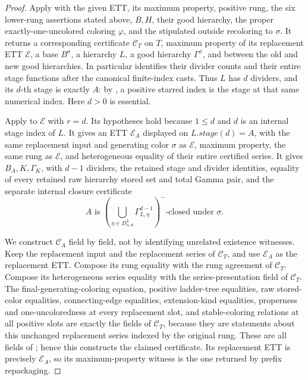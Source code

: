 \begin{proof}
Apply  with the given ETT, its maximum
property, positive rung, the six lower-rung assertions stated above,
$B,H$, their good hierarchy, the proper exactly-one-uncolored coloring
$\varphi$, and the stipulated outside recoloring to $\sigma$.
It returns a corresponding certificate $\mathcal C_T$ on $T$, maximum
property of its replacement ETT $\mathcal E$, a base $B^\sigma$, a
hierarchy $L$, a good hierarchy $\Gamma^\sigma$, and
 between the old and new good hierarchies.
In particular  identifies their divider
counts and their entire stage functions after the canonical finite-index
casts. Thus $L$ has $d$ dividers, and its $d$-th stage is exactly $A$:
by , a positive starred index is the
stage at that same numerical index. Here $d>0$ is essential.

Apply  to $\mathcal E$ with
$r=d$. Its hypotheses hold because $1\leq d$ and $d$ is an internal
stage index of $L$. It gives an ETT $\mathcal E_A$ displayed on
$L.\mathit{stage}(d)=A$, with the same replacement input and generating
color $\sigma$ as $\mathcal E$, maximum property, the same rung as
$\mathcal E$, and heterogeneous equality of their entire certified
series. It gives $B_A,K,\Gamma_K$, with $d-1$ dividers, the retained
stage and divider identities, equality of every retained raw hierarchy
stored set and total Gamma pair, and the separate internal closure
certificate
\[
 A\text{ is }
 \left(\bigcup_{\eta\in D^L_{n,d}}\Gamma^{d-1}_{L,\eta}\right)^-
 \text{-closed under }\sigma.                                      \tag{1}
\]

We construct $\mathcal C_A$ field by field, not by identifying unrelated
existence witnesses. Keep the replacement input and the replacement
series of $\mathcal C_T$, and use $\mathcal E_A$ as the replacement ETT.
Compose its rung equality with the rung agreement of $\mathcal C_T$.
Compose its heterogeneous series equality with the series-presentation
field of $\mathcal C_T$. The final-generating-coloring equation,
positive ladder-tree equalities, raw stored-color equalities,
connecting-edge equalities, extension-kind equalities, properness and
one-uncoloredness at every replacement slot, and stable-coloring
relations at all positive slots are exactly the fields of $\mathcal C_T$,
because they are statements about this unchanged replacement series
indexed by the original rung. These are all fields of
; hence this constructs the
claimed certificate. Its replacement ETT is precisely $\mathcal E_A$,
so its maximum-property witness is the one returned by prefix repackaging.


\end{proof}
